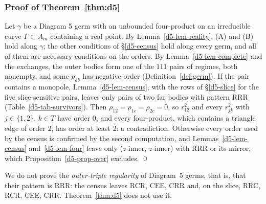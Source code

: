 \subsubsection{Proof of Theorem~\ref{thm:d5}}
Let $\gamma$ be a Diagram 5 germ with an unbounded four-product on an irreducible curve
$\Gamma\subset A_m$ containing a real point.  By Lemma~\ref{d5-lem-reality}, (A) and (B) hold along
$\gamma$; the other conditions of \S\ref{d5-census} hold along every germ, and all of them are
necessary conditions on the orders.  By Lemma~\ref{d5-lem-complete} and the exchanges, the outer
bodies form one of the $111$ pairs of regimes, both nonempty, and some $p_{ab}$ has negative order
(Definition~\ref{def:germ}).  If the pair contains a monopole, Lemma~\ref{d5-lem-census}, with the
rows of \S\ref{d5-slice} for the five slice-sensitive pairs, leaves only pairs of two far bodies
with pattern RRR (Table~\ref{d5-tab-survivors}).  Then $\rho_{12}=\rho_{1c}=\rho_{2c}=0$, so
$r_{12}^2$ and every $r_{jk}^2$ with $j\in\{1,2\}$, $k\in T$ have order $0$, and every four-product,
which contains a triangle edge of order $2$, has order at least $2$: a contradiction.  Otherwise
every order used by the census is confirmed by the second computation, and
Lemmas~\ref{d5-lem-census} and~\ref{d5-lem-four} leave only ($z$-inner, $z$-inner) with RRR or
its mirror, which Proposition~\ref{d5-prop-over} excludes.  \qed

\begin{remark}\label{d5-rem-h1}
We do not prove the \emph{outer-triple regularity} of Diagram~5 germs, that is, that their pattern
is RRR: the census leaves RCR, CEE, CRR and, on the slice, RRC, RCR, CEE, CRR.
Theorem~\ref{thm:d5} does not use it.
\end{remark}
